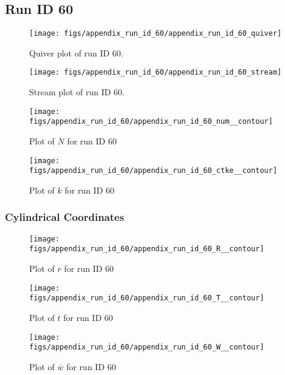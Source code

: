 \subsection{Run ID 60}
\begin{figure}[H]
\centering
\texttt{[image: figs/appendix\_run\_id\_60/appendix\_run\_id\_60\_quiver]}
\caption{Quiver plot of run ID 60.}
\label{fig:appendix_run_id_60_quiver}
\end{figure}


\begin{figure}[H]
\centering
\texttt{[image: figs/appendix\_run\_id\_60/appendix\_run\_id\_60\_stream]}
\caption{Stream plot of run ID 60.}
\label{fig:appendix_run_id_60_stream}
\end{figure}


\begin{figure}[H]
\centering
\texttt{[image: figs/appendix\_run\_id\_60/appendix\_run\_id\_60\_num\_\_contour]}
\caption{Plot of $N$ for run ID 60}
\label{fig:appendix_run_id_60_num__contour}
\end{figure}


\begin{figure}[H]
\centering
\texttt{[image: figs/appendix\_run\_id\_60/appendix\_run\_id\_60\_ctke\_\_contour]}
\caption{Plot of $k$ for run ID 60}
\label{fig:appendix_run_id_60_ctke__contour}
\end{figure}


\subsubsection{Cylindrical Coordinates}
\begin{figure}[H]
\centering
\texttt{[image: figs/appendix\_run\_id\_60/appendix\_run\_id\_60\_R\_\_contour]}
\caption{Plot of $\overline{r}$ for run ID 60}
\label{fig:appendix_run_id_60_R__contour}
\end{figure}


\begin{figure}[H]
\centering
\texttt{[image: figs/appendix\_run\_id\_60/appendix\_run\_id\_60\_T\_\_contour]}
\caption{Plot of $\overline{t}$ for run ID 60}
\label{fig:appendix_run_id_60_T__contour}
\end{figure}


\begin{figure}[H]
\centering
\texttt{[image: figs/appendix\_run\_id\_60/appendix\_run\_id\_60\_W\_\_contour]}
\caption{Plot of $\overline{w}$ for run ID 60}
\label{fig:appendix_run_id_60_W__contour}
\end{figure}


